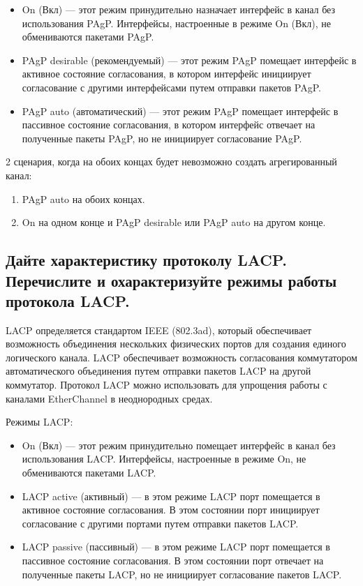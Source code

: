 \begin{itemize}
    \item On (Вкл) — этот режим принудительно назначает интерфейс в
    канал без использования PAgP. Интерфейсы, настроенные в режиме
    On (Вкл), не обмениваются пакетами PAgP.
    \item PAgP desirable (рекомендуемый) — этот режим PAgP помещает
    интерфейс в активное состояние согласования, в котором
    интерфейс инициирует согласование с другими интерфейсами
    путем отправки пакетов PAgP.
    \item PAgP auto (автоматический) — этот режим PAgP помещает
    интерфейс в пассивное состояние согласования, в котором
    интерфейс отвечает на полученные пакеты PAgP, но не инициирует
    согласование PAgP.
\end{itemize}

2 сценария, когда на обоих концах будет невозможно создать
агрегированный канал:

\begin{enumerate}
    \item PAgP auto на обоих концах.
    \item On на одном конце и PAgP desirable или PAgP auto на другом
    конце.
\end{enumerate}

\subsection{Дайте характеристику протоколу LACP. Перечислите и
охарактеризуйте режимы работы протокола LACP.}

LACP определяется стандартом IEEE (802.3ad), который обеспечивает
возможность объединения нескольких физических портов для создания
единого логического канала. LACP обеспечивает возможность согласования
коммутатором автоматического объединения путем отправки пакетов LACP
на другой коммутатор. Протокол LACP можно использовать для упрощения
работы с каналами EtherChannel в неоднородных средах.

Режимы LACP:
\begin{itemize}
    \item On (Вкл) — этот режим принудительно помещает интерфейс в
    канал без использования LACP. Интерфейсы, настроенные в
    режиме On, не обмениваются пакетами LACP.
    \item LACP active (активный) — в этом режиме LACP порт
    помещается в активное состояние согласования. В этом состоянии
    порт инициирует согласование с другими портами путем отправки
    пакетов LACP.
    \item LACP passive (пассивный) — в этом режиме LACP порт
    помещается в пассивное состояние согласования. В этом состоянии
    порт отвечает на полученные пакеты LACP, но не инициирует
    согласование пакетов LACP.
\end{itemize}

